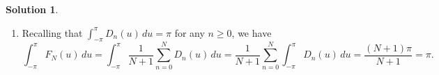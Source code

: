 \documentclass[12pt]{article}
\makeatletter
\theoremstyle{definition}
\theoremstyle{exercise}
\theoremstyle{solution}
\newtheorem*{solution}{Solution}
\DeclarePairedDelimiter\abs{\lvert}{\rvert}
\let\oldabs\abs
\def\abs{\@ifstar{\oldabs}{\oldabs*}}
\DeclarePairedDelimiter\paren{(}{)}
\let\oldparen\paren
\def\paren{\@ifstar{\oldparen}{\oldparen*}}
\makeatother
\begin{document}
\begin{solution}
\begin{enumerate}
        Let \( 0 < \delta < \pi \) be given and set \( A = \{ u \in [-\pi, \pi] : \delta \leq \abs{u} \} \). For any \( u \in A \), observe that \( \sin^2 \paren{ \tfrac{\delta}{2} } \leq \sin^2 \paren{ \tfrac{u}{2} } \). Since \( \delta \in (0, \pi) \), we have \( \sin^2 \paren{ \tfrac{\delta}{2} } > 0 \) and thus
        \[
            \frac{1}{\sin^2 \paren{ \tfrac{u}{2} }} \leq \frac{1}{\sin^2 \paren{ \tfrac{\delta}{2} }}
        \]
        for each \( u \in A \). It follows that
        \[
            \abs{F_N(u)} = \frac{1}{2(N + 1)} \cdot \frac{\sin^2 \paren{ (N + 1) \tfrac{u}{2} }}{\sin^2 \paren{ \tfrac{u}{2} }} \leq \frac{1}{2(N + 1)} \cdot \frac{1}{\sin^2 \paren{ \tfrac{\delta}{2} }}
        \]
        for all \( u \in A \). It is clear from this bound that \( F_N \to 0 \) uniformly on \( A \).

        \item Recalling that \( \int_{-\pi}^{\pi} D_n(u) \, du = \pi \) for any \( n \geq 0 \), we have
        \[
            \int_{-\pi}^{\pi} F_N(u) \, du = \int_{-\pi}^{\pi} \frac{1}{N + 1} \sum_{n=0}^N D_n(u) \, du = \frac{1}{N + 1} \sum_{n=0}^N \int_{-\pi}^{\pi} D_n(u) \, du = \frac{(N + 1) \pi}{N + 1} = \pi.
        \]


\end{enumerate}
\end{solution}
\end{document}
